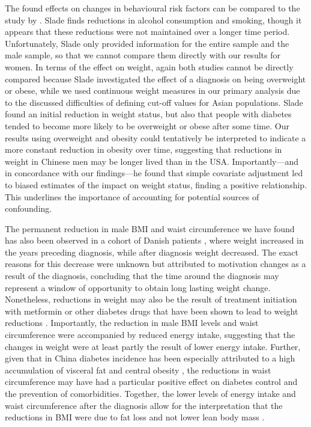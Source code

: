 The found effects on changes in behavioural risk factors can be compared to the study by \textcite{Slade2012}. Slade finds reductions in alcohol consumption and smoking, though it appears that these reductions were not maintained over a longer time period. Unfortunately, Slade only provided information for the entire sample and the male sample, so that we cannot compare them directly with our results for women. In terms of the effect on weight, again both studies cannot be directly compared because Slade investigated the effect of a diagnosis on being overweight or obese, while we used continuous weight measures in our primary analysis due to the discussed difficulties of defining cut-off values for Asian populations. Slade found an initial reduction in weight status, but also that people with diabetes tended to become more likely to be overweight or obese after some time. Our results using overweight and obesity could tentatively be interpreted to indicate a more constant reduction in obesity over time, suggesting that reductions in weight in Chinese men may be longer lived than in the USA. Importantly---and in concordance with our findings---he found that simple covariate adjustment led to biased estimates of the impact on weight status, finding a positive relationship. This underlines the importance of accounting for potential sources of confounding.

The permanent reduction in male \ac{BMI} and waist circumference we have found has also been observed in a cohort of Danish patients \autocite{DeFineOlivarius2015}, where weight increased in the years preceding diagnosis, while after diagnosis weight decreased. The exact reasons for this decrease were unknown but attributed to motivation changes as a result of the diagnosis, concluding that the time around the diagnosis may represent a window of opportunity to obtain long lasting weight change. Nonetheless, reductions in weight may also be the result of treatment initiation with metformin or other diabetes drugs that have been shown to lead to weight reductions \autocite{Yang2014}. Importantly, the reduction in male \ac{BMI} levels and waist circumference were accompanied by reduced energy intake, suggesting that the changes in weight were at least partly the result of lower energy intake.  Further, given that in China diabetes incidence has been especially attributed to a high accumulation of visceral fat and central obesity \autocite{Ma2014}, the reductions in waist circumference may have had a particular positive effect on diabetes control and the prevention of comorbidities. Together, the lower levels of energy intake and waist circumference after the diagnosis allow for the interpretation that the reductions in \ac{BMI} were due to fat loss and not lower lean body mass \autocite{Klein2007}. 

